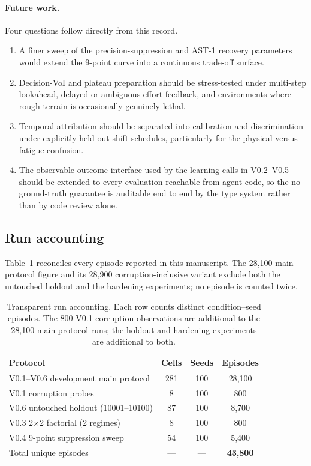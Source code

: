 \documentclass{article}
\begin{document}
\paragraph{Future work.}
Four questions follow directly from this record.
\begin{enumerate}
  \item A finer sweep of the precision-suppression and AST-1 recovery parameters would extend the 9-point curve into a continuous trade-off surface.
  \item Decision-VoI and plateau preparation should be stress-tested under multi-step lookahead, delayed or ambiguous effort feedback, and environments where rough terrain is occasionally genuinely lethal.
  \item Temporal attribution should be separated into calibration and discrimination under explicitly held-out shift schedules, particularly for the physical-versus-fatigue confusion.
  \item The observable-outcome interface used by the learning calls in V0.2--V0.5 should be extended to every evaluation reachable from agent code, so the no-ground-truth guarantee is auditable end to end by the type system rather than by code review alone.
\end{enumerate}

\subsection{Run accounting}

Table~\ref{tab:runs} reconciles every episode reported in this manuscript. The 28{,}100 main-protocol
figure and its 28{,}900 corruption-inclusive variant exclude both the untouched holdout and the
hardening experiments; no episode is counted twice.

\begin{table}[t]
\centering
\small
\caption{Transparent run accounting. Each row counts distinct condition--seed episodes. The 800 V0.1
corruption observations are additional to the 28{,}100 main-protocol runs; the holdout and hardening
experiments are additional to both.}
\label{tab:runs}
\begin{tabular}{lccc}
\toprule
Protocol & Cells & Seeds & Episodes \\
\midrule
V0.1--V0.6 development main protocol & 281 & 100 & 28{,}100 \\
V0.1 corruption probes & 8 & 100 & 800 \\
V0.6 untouched holdout (10001--10100) & 87 & 100 & 8{,}700 \\
V0.3 2$\times$2 factorial (2 regimes) & 8 & 100 & 800 \\
V0.4 9-point suppression sweep & 54 & 100 & 5{,}400 \\
\midrule
Total unique episodes & --- & --- & \textbf{43{,}800} \\
\bottomrule
\end{tabular}
\end{table}
\end{document}
